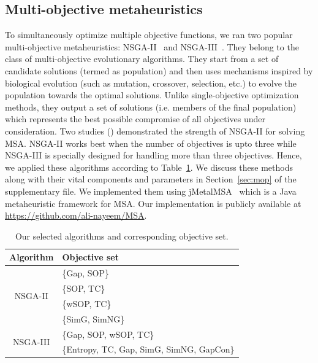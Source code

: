 \subsection{Multi-objective metaheuristics} %
To simultaneously optimize multiple objective functions, we ran two popular multi-objective metaheuristics: NSGA-II~\citep{deb2002fast} and NSGA-III~\citep{deb2014evolutionary}. They belong to the class of multi-objective evolutionary algorithms. They start from a set of candidate solutions (termed as population) and then uses mechanisms inspired by biological evolution (such as mutation, crossover, selection, etc.) to evolve the population towards the optimal solutions. Unlike single-objective optimization methods, they output a set of solutions (i.e. members of the final population)
which represents the best possible compromise of all objectives under consideration. Two studies (\citep{zambrano2017m2align, ortuno2013optimizing}) demonstrated the strength of NSGA-II for solving MSA. NSGA-II works best when the number of objectives is upto three while NSGA-III is specially designed for handling more than three objectives. Hence, we applied these algorithms according to Table~\ref{tab:variants}.
We discuss these methods along with their vital components and parameters in Section~\ref{sec:mop} of the supplementary file. We implemented them using jMetalMSA~\citealp{zambrano2017multi} which is a Java metaheuristic framework for MSA. Our implementation is publicly available at \url{https://github.com/ali-nayeem/MSA}.
\begin{table}[!htbp]
	\centering
	\caption{Our selected algorithms and corresponding objective set.}
	\begin{tabular}{|c|l|} %
		\hline
		Algorithm & Objective set \\
		\hline
		\multicolumn{1}{|c|}{\multirow{4}{*}{NSGA-II}} & \{Gap, SOP\}\\
		& \{SOP, TC\}          \\
		& \{wSOP, TC\} \\
		& \{SimG, SimNG\} \\
		\hline
		\multicolumn{1}{|c|}{\multirow{3}{*}{NSGA-III}} & \{Gap, SOP, wSOP, TC\} \\
		& \{Entropy, TC, Gap, SimG, SimNG, GapCon\} \\
		\hline
	\end{tabular}%
	\label{tab:variants}%
\end{table}%


